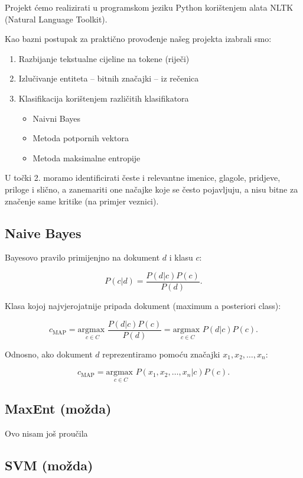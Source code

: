 \documentclass[12pt,a4paper,titlepage]{article}
\begin{document}
Projekt ćemo realizirati u programskom jeziku Python korištenjem alata NLTK (Natural Language Toolkit). 

Kao bazni postupak za praktično provođenje našeg projekta izabrali smo:

\begin{enumerate}
  \item Razbijanje tekstualne cijeline na tokene (riječi)
  \item Izlučivanje entiteta -- bitnih značajki -- iz rečenica
  \item Klasifikacija korištenjem različitih klasifikatora
  \begin{itemize}
    \item Naivni Bayes
    \item Metoda potpornih vektora
    \item Metoda maksimalne entropije
  \end{itemize}
\end{enumerate}

U točki 2. moramo identificirati česte i relevantne imenice, glagole, pridjeve, priloge i slično, a zanemariti one načajke koje se često pojavljuju, a nisu bitne za značenje same kritike (na primjer veznici).

\subsection{Naive Bayes}

Bayesovo pravilo primijenjno na dokument $d$ i klasu $c$:

\[P(c|d) = \frac{P(d|c)P(c)}{P(d)}.\]

Klasa kojoj najvjerojatnije pripada dokument (maximum a posteriori class):

\[c_{\text{MAP}} = \underset{{c \in C}}{\text{argmax }} \frac{P(d|c)P(c)}{P(d)}
= \underset{{c \in C}}{\text{argmax }} P(d|c)P(c).\] 

Odnosno, ako dokument $d$ reprezentiramo pomoću značajki $x_1, x_2, \ldots, x_n$:

\[c_{\text{MAP}} = \underset{{c \in C}}{\text{argmax }} P(x_1, x_2, \ldots, x_n|c)P(c).\] 

\subsection{MaxEnt (možda)}

Ovo nisam još proučila

\subsection{SVM (možda)}
\end{document}
